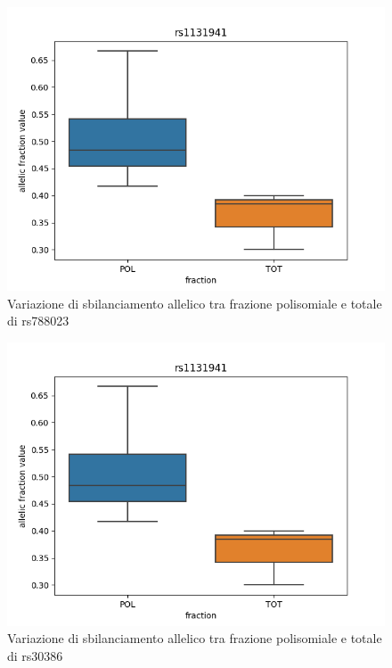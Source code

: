 \begin{figure}[H]
  \centering
  \includegraphics[scale=0.5]{boxplot/scr_DMSO_rs1131941.png}
  \caption{Variazione di sbilanciamento allelico tra frazione polisomiale e totale di rs788023}
  \label{fig:SF3B1}
\end{figure}

\begin{figure}[H]
  \centering
  \includegraphics[scale=0.5]{boxplot/scr_DMSO_rs1131941.png}
  \caption{Variazione di sbilanciamento allelico tra frazione polisomiale e totale di rs30386}
  \label{fig:TBC1D9B}
\end{figure}

